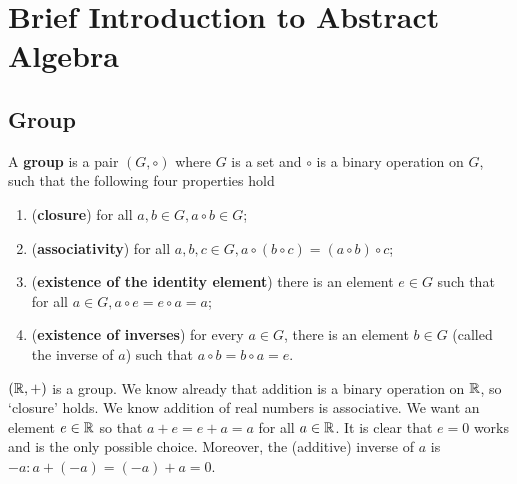 \documentclass[12pt]{book}
\begin{document}
\section{Brief Introduction to Abstract Algebra}
\label{sec:Abstract Algebra}

\subsection{Group}
\label{sec:Group}

\begin{defi}\label{def:group1}
      A \textbf{group} is a pair $(G,\circ)$ where $G$ is a set and $\circ$ is a binary operation on $G$, such that the following four properties hold
	  \begin{enumerate}
	        \item (\textbf{closure}) for all $a, b \in G, a \circ b \in G$;
			\item (\textbf{associativity}) for all $a, b, c \in G, a \circ (b \circ c) = (a \circ b) \circ c$;
			\item (\textbf{existence of the identity element}) there is an element $e \in G$ such that for all $a \in G, a \circ e = e \circ a = a$;
			\item (\textbf{existence of inverses}) for every $a \in G$, there is an element $b \in G$ (called the inverse of $a$) such that
            $a \circ b = b \circ a = e$.
	  \end{enumerate}
\end{defi}

\begin{examp}\label{exp:group1}
      $(\mathbb{R},+)$ is a group. We know already that addition is a binary operation on $\mathbb{R}$, so ‘closure’ holds. We know addition of real numbers
       is associative. We want an element $e \in \mathbb{R}$ so that $a + e = e + a = a$ for all $a \in \mathbb{R}$. It is clear that $e = 0$ works and 
	   is the only possible choice. Moreover, the (additive) inverse of $a$ is $-a : a +(-a) = (-a) + a = 0$.
\end{examp}
\end{document}
